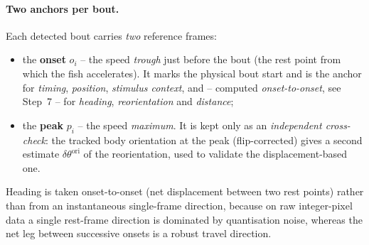 \documentclass{article}
\begin{document}
\paragraph{Two anchors per bout.}
Each detected bout carries \emph{two} reference frames:
\begin{itemize}
  \item the \textbf{onset} $o_i$ -- the speed \emph{trough} just before the bout
        (the rest point from which the fish accelerates). It marks the physical
        bout start and is the anchor for \emph{timing}, \emph{position},
        \emph{stimulus context}, and -- computed \emph{onset-to-onset}, see
        Step~7 -- for \emph{heading}, \emph{reorientation} and \emph{distance};
  \item the \textbf{peak} $p_i$ -- the speed \emph{maximum}. It is kept only as
        an \emph{independent cross-check}: the tracked body orientation at the
        peak (flip-corrected) gives a second estimate $\delta\theta^{\text{ori}}$
        of the reorientation, used to validate the displacement-based one.
\end{itemize}
Heading is taken onset-to-onset (net displacement between two rest points)
rather than from an instantaneous single-frame direction, because on raw
integer-pixel data a single rest-frame direction is dominated by quantisation
noise, whereas the net leg between successive onsets is a robust travel
direction.
\end{document}
